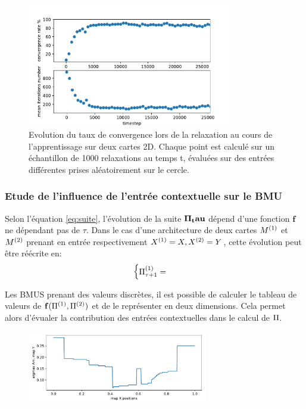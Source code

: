\begin{figure}
\centering
\includegraphics[width=0.8\textwidth]{2D_conv_evolution.pdf}
\caption{Evolution du taux de convergence lors de la relaxation au cours de l'apprentissage sur deux cartes 2D. Chaque point est calculé sur un échantillon de 1000 relaxations au temps t, évaluées sur des entrées différentes prises aléatoirement sur le cercle.}
\label{fig:conv_evolution}
\end{figure}

\subsubsection{Etude de l'influence de l'entrée contextuelle sur le BMU}

Selon l'équation \ref{eq:suite}, l'évolution de la suite $\mathbf{\Pi_tau}$ dépend d'une fonction $\mathbf{f}$ ne dépendant pas de $\tau$. Dans le cas d'une architecture de deux cartes $M^{({1})}$ et $M^{({2})}$ prenant en entrée respectivement $X^{({1})} = X, X^{({2})} = Y$, cette évolution peut être réécrite en:
\begin{equation}
\begin{cases}
\Pi^{({1})}_{\tau+1} = 
\end{cases}
\end{equation}

Les BMUS prenant des valeurs discrètes, il est possible de calculer le tableau de valeurs de $\mathbf{f}(\Pi^{({1})},\Pi^{({2})})$ et de le représenter en deux dimensions. Cela permet alors d'évualer la contribution des entrées contextuelles dans le calcul de $\Pi$.

\begin{figure}
\centering
\includegraphics[width=0.7\textwidth]{am_006_X.pdf}
\end{figure}

